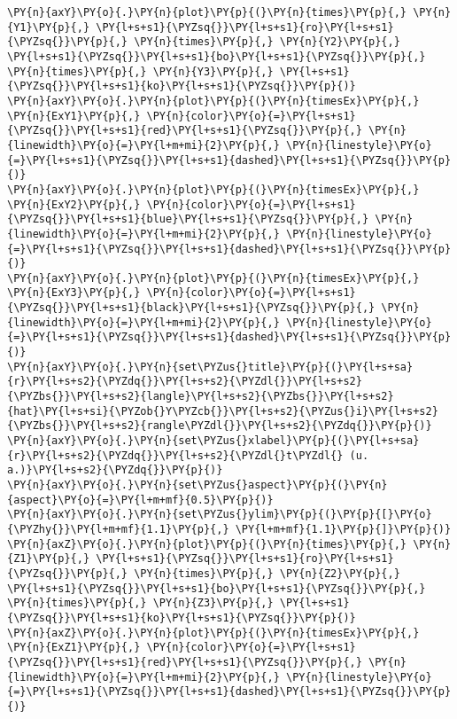 \begin{tcolorbox}[breakable, size=fbox, boxrule=1pt, pad at break*=1mm,colback=cellbackground, colframe=cellborder]
\begin{Verbatim}[commandchars=\\\{\}]
\PY{n}{axY}\PY{o}{.}\PY{n}{plot}\PY{p}{(}\PY{n}{times}\PY{p}{,} \PY{n}{Y1}\PY{p}{,} \PY{l+s+s1}{\PYZsq{}}\PY{l+s+s1}{ro}\PY{l+s+s1}{\PYZsq{}}\PY{p}{,} \PY{n}{times}\PY{p}{,} \PY{n}{Y2}\PY{p}{,} \PY{l+s+s1}{\PYZsq{}}\PY{l+s+s1}{bo}\PY{l+s+s1}{\PYZsq{}}\PY{p}{,} \PY{n}{times}\PY{p}{,} \PY{n}{Y3}\PY{p}{,} \PY{l+s+s1}{\PYZsq{}}\PY{l+s+s1}{ko}\PY{l+s+s1}{\PYZsq{}}\PY{p}{)}
\PY{n}{axY}\PY{o}{.}\PY{n}{plot}\PY{p}{(}\PY{n}{timesEx}\PY{p}{,} \PY{n}{ExY1}\PY{p}{,} \PY{n}{color}\PY{o}{=}\PY{l+s+s1}{\PYZsq{}}\PY{l+s+s1}{red}\PY{l+s+s1}{\PYZsq{}}\PY{p}{,} \PY{n}{linewidth}\PY{o}{=}\PY{l+m+mi}{2}\PY{p}{,} \PY{n}{linestyle}\PY{o}{=}\PY{l+s+s1}{\PYZsq{}}\PY{l+s+s1}{dashed}\PY{l+s+s1}{\PYZsq{}}\PY{p}{)}
\PY{n}{axY}\PY{o}{.}\PY{n}{plot}\PY{p}{(}\PY{n}{timesEx}\PY{p}{,} \PY{n}{ExY2}\PY{p}{,} \PY{n}{color}\PY{o}{=}\PY{l+s+s1}{\PYZsq{}}\PY{l+s+s1}{blue}\PY{l+s+s1}{\PYZsq{}}\PY{p}{,} \PY{n}{linewidth}\PY{o}{=}\PY{l+m+mi}{2}\PY{p}{,} \PY{n}{linestyle}\PY{o}{=}\PY{l+s+s1}{\PYZsq{}}\PY{l+s+s1}{dashed}\PY{l+s+s1}{\PYZsq{}}\PY{p}{)}
\PY{n}{axY}\PY{o}{.}\PY{n}{plot}\PY{p}{(}\PY{n}{timesEx}\PY{p}{,} \PY{n}{ExY3}\PY{p}{,} \PY{n}{color}\PY{o}{=}\PY{l+s+s1}{\PYZsq{}}\PY{l+s+s1}{black}\PY{l+s+s1}{\PYZsq{}}\PY{p}{,} \PY{n}{linewidth}\PY{o}{=}\PY{l+m+mi}{2}\PY{p}{,} \PY{n}{linestyle}\PY{o}{=}\PY{l+s+s1}{\PYZsq{}}\PY{l+s+s1}{dashed}\PY{l+s+s1}{\PYZsq{}}\PY{p}{)}
\PY{n}{axY}\PY{o}{.}\PY{n}{set\PYZus{}title}\PY{p}{(}\PY{l+s+sa}{r}\PY{l+s+s2}{\PYZdq{}}\PY{l+s+s2}{\PYZdl{}}\PY{l+s+s2}{\PYZbs{}}\PY{l+s+s2}{langle}\PY{l+s+s2}{\PYZbs{}}\PY{l+s+s2}{hat}\PY{l+s+si}{\PYZob{}Y\PYZcb{}}\PY{l+s+s2}{\PYZus{}i}\PY{l+s+s2}{\PYZbs{}}\PY{l+s+s2}{rangle\PYZdl{}}\PY{l+s+s2}{\PYZdq{}}\PY{p}{)}
\PY{n}{axY}\PY{o}{.}\PY{n}{set\PYZus{}xlabel}\PY{p}{(}\PY{l+s+sa}{r}\PY{l+s+s2}{\PYZdq{}}\PY{l+s+s2}{\PYZdl{}t\PYZdl{} (u. a.)}\PY{l+s+s2}{\PYZdq{}}\PY{p}{)}
\PY{n}{axY}\PY{o}{.}\PY{n}{set\PYZus{}aspect}\PY{p}{(}\PY{n}{aspect}\PY{o}{=}\PY{l+m+mf}{0.5}\PY{p}{)}
\PY{n}{axY}\PY{o}{.}\PY{n}{set\PYZus{}ylim}\PY{p}{(}\PY{p}{[}\PY{o}{\PYZhy{}}\PY{l+m+mf}{1.1}\PY{p}{,} \PY{l+m+mf}{1.1}\PY{p}{]}\PY{p}{)}
\PY{n}{axZ}\PY{o}{.}\PY{n}{plot}\PY{p}{(}\PY{n}{times}\PY{p}{,} \PY{n}{Z1}\PY{p}{,} \PY{l+s+s1}{\PYZsq{}}\PY{l+s+s1}{ro}\PY{l+s+s1}{\PYZsq{}}\PY{p}{,} \PY{n}{times}\PY{p}{,} \PY{n}{Z2}\PY{p}{,} \PY{l+s+s1}{\PYZsq{}}\PY{l+s+s1}{bo}\PY{l+s+s1}{\PYZsq{}}\PY{p}{,} \PY{n}{times}\PY{p}{,} \PY{n}{Z3}\PY{p}{,} \PY{l+s+s1}{\PYZsq{}}\PY{l+s+s1}{ko}\PY{l+s+s1}{\PYZsq{}}\PY{p}{)}
\PY{n}{axZ}\PY{o}{.}\PY{n}{plot}\PY{p}{(}\PY{n}{timesEx}\PY{p}{,} \PY{n}{ExZ1}\PY{p}{,} \PY{n}{color}\PY{o}{=}\PY{l+s+s1}{\PYZsq{}}\PY{l+s+s1}{red}\PY{l+s+s1}{\PYZsq{}}\PY{p}{,} \PY{n}{linewidth}\PY{o}{=}\PY{l+m+mi}{2}\PY{p}{,} \PY{n}{linestyle}\PY{o}{=}\PY{l+s+s1}{\PYZsq{}}\PY{l+s+s1}{dashed}\PY{l+s+s1}{\PYZsq{}}\PY{p}{)}

\end{Verbatim}
\end{tcolorbox}
